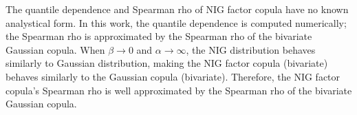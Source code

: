 The quantile dependence and Spearman rho of NIG factor copula have no known analystical form.
In this work, the quantile dependence is computed numerically; 
the Spearman rho is approximated by the Spearman rho of the bivariate Gaussian copula. 
When $\beta \rightarrow 0$ and $\alpha \rightarrow \infty$, the NIG distribution behaves similarly to Gaussian distribution, 
making the NIG factor copula (bivariate) behaves similarly to the Gaussian copula (bivariate). 
Therefore, the NIG factor copula's Spearman rho is well approximated by the Spearman rho of the bivariate Gaussian copula.





